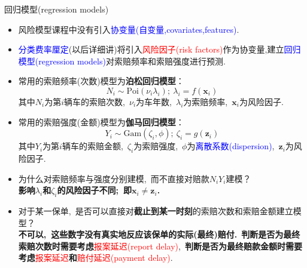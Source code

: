 \documentclass[professionalfont]{beamer}
\newcommand{\red}[1]{\textcolor{red}{#1}}
\newcommand{\green}[1]{\textbf{#1}}
\newcommand{\blue}[1]{\textcolor{blue}{#1}}
\def\bx{\boldsymbol{x}}
\def\bz{\boldsymbol{z}}
\begin{document}
\begin{frame}{回归模型(regression models)}
	\begin{itemize}
\item  风险模型课程中没有引入\blue{协变量(自变量,covariates,features)}.
\item \blue{分类费率厘定}(以后详细讲)将引入\red{风险因子(risk factors)}作为协变量,建立\blue{回归模型(regression models)}对索赔频率和索赔强度进行预测.
\item 
常用的索赔频率(次数)模型为\green{泊松回归模型}：
$$N_i\sim \text{Poi}(\nu_i\lambda_i);~\lambda_i=f(\bx_i)$$
其中$N_i$为第$i$辆车的索赔次数,~$\nu_i$为车年数,~$\lambda_i$为索赔频率,~$\bx_i$为风险因子.

\item 常用的索赔强度(金额)模型为\green{伽马回归模型}：
$$Y_i\sim \text{Gam}(\zeta_i,\phi);~\zeta_i=g(\bz_i)$$
其中$Y_i$为第$i$辆车的索赔金额,~$\zeta_i$为索赔强度,~$\phi$为\blue{离散系数(dispersion)},~$\bz_i$为风险因子.
	\end{itemize}
\end{frame}	
\begin{frame}
	\begin{itemize}
	\item 为什么对索赔频率与强度分别建模,~而不直接对赔款$N_iY_i$建模？\pause \\ \green{影响$\lambda_i$和$\zeta_i$的风险因子不同;~即$\bx_i\neq\bz_i$. }\pause
	\item 对于某一保单,~是否可以直接对\green{截止到某一时刻}的索赔次数和索赔金额建立模型？\pause\\\green{不可以,~这些数字没有真实地反应该保单的实际(最终)赔付.}~\green{判断是否为最终索赔次数时需要考虑}\red{报案延迟(report delay)},~\green{判断是否为最终赔款金额时需要考虑}\red{报案延迟}\green{和}\red{赔付延迟(payment delay)}.
	\end{itemize}
\end{frame}
\end{document}

